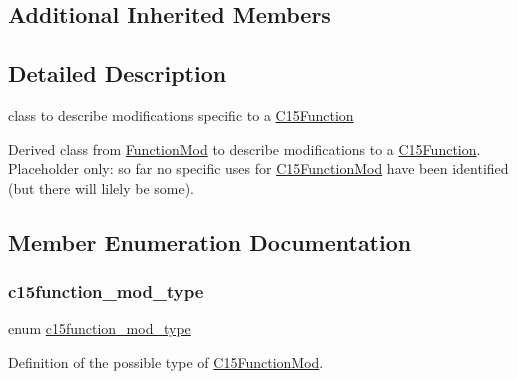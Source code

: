 \subsection*{Additional Inherited Members}


\subsection{Detailed Description}
class to describe modifications specific to a \mbox{\hyperlink{class_s_m_spp__di__unipi__it_1_1_c15_function}{C15\+Function}} 

Derived class from \mbox{\hyperlink{class_s_m_spp__di__unipi__it_1_1_function_mod}{Function\+Mod}} to describe modifications to a \mbox{\hyperlink{class_s_m_spp__di__unipi__it_1_1_c15_function}{C15\+Function}}. Placeholder only\+: so far no specific uses for \mbox{\hyperlink{class_s_m_spp__di__unipi__it_1_1_c15_function_mod}{C15\+Function\+Mod}} have been identified (but there will lilely be some). 

\subsection{Member Enumeration Documentation}
\mbox{\label{class_s_m_spp__di__unipi__it_1_1_c15_function_mod_afa67a9e3434632b6b9a0c393b08e0936}} 
\subsubsection{\texorpdfstring{c15function\+\_\+mod\+\_\+type}{c15function\_mod\_type}}
{\footnotesize\ttfamily enum \mbox{\hyperlink{class_s_m_spp__di__unipi__it_1_1_c15_function_mod_afa67a9e3434632b6b9a0c393b08e0936}{c15function\+\_\+mod\+\_\+type}}}



Definition of the possible type of \mbox{\hyperlink{class_s_m_spp__di__unipi__it_1_1_c15_function_mod}{C15\+Function\+Mod}}. 


